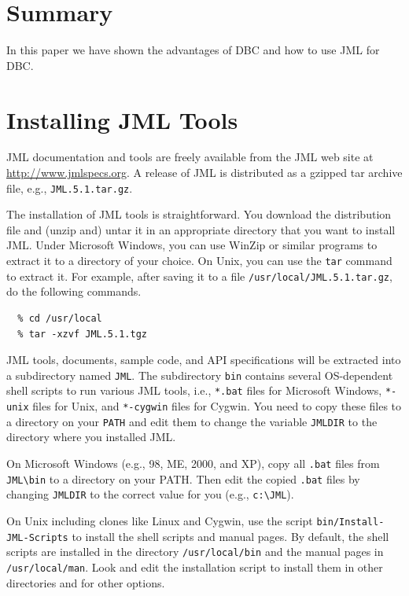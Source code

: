 \documentclass[twocolumn]{article}
\begin{document}
\section{Summary}

In this paper we have shown the advantages of DBC and how to use JML
for DBC.

\appendix
\section{Installing JML Tools}
\label{sect-appendix}

JML documentation and tools are freely available from the JML web site
at \url{http://www.jmlspecs.org}. A release of JML is distributed as a
gzipped tar archive file, e.g., \texttt{JML.5.1.tar.gz}.

The installation of JML tools is straightforward. You download the
distribution file and (unzip and) untar it in an appropriate directory
that you want to install JML. Under Microsoft Windows, you can use
WinZip or similar programs to extract it to a directory of your
choice. On Unix, you can use the \texttt{tar} command to extract it.
For example, after saving it to a file
\texttt{/usr/local/JML.5.1.tar.gz}, do the following commands.

\begin{verbatim}
  % cd /usr/local
  % tar -xzvf JML.5.1.tgz
\end{verbatim}

JML tools, documents, sample code, and API specifications will be
extracted into a subdirectory named \texttt{JML}. The subdirectory
\texttt{bin} contains several OS-dependent shell scripts to run
various JML tools, i.e., \texttt{*.bat} files for Microsoft Windows,
\texttt{*-unix} files for Unix, and \texttt{*-cygwin} files for
Cygwin. You need to copy these files to a directory on your
\texttt{PATH} and edit them to change the variable \texttt{JMLDIR} to
the directory where you installed JML.

On Microsoft Windows (e.g., 98, ME, 2000, and XP), copy all
\texttt{.bat} files from \verb|JML\bin| to a directory on your PATH.
Then edit the copied \texttt{.bat} files by changing \texttt{JMLDIR}
to the correct value for you (e.g., \verb|c:\JML|).

On Unix including clones like Linux and Cygwin, use the script
\texttt{bin/Install-JML-Scripts} to install the shell scripts and
manual pages. By default, the shell scripts are installed in the
directory \texttt{/usr/local/bin} and the manual pages in
\texttt{/usr/local/man}. Look and edit the installation script to
install them in other directories and for other options.
\end{document}
